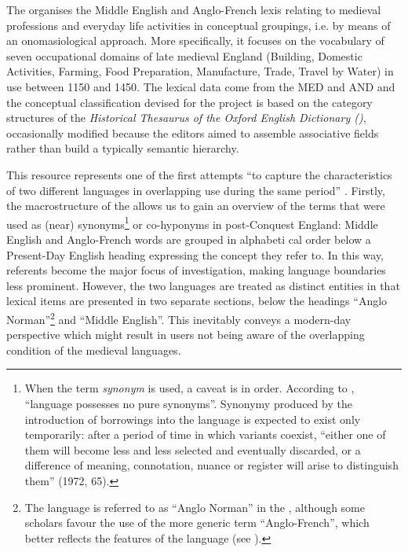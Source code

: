 \documentclass[output=paper,colorlinks,citecolor=brown,arabicfont,chinesefont]{langscibook}
\begin{document}
The \citet{[BTh]} organises the Middle English and Anglo-French lexis relating to medieval professions and everyday life activities in conceptual groupings, i.e. by means of an onomasiological approach. More specifically, it focuses on the vocabulary of seven occupational domains of late medieval England (Building, Domestic Activities, Farming, Food Preparation, Manufacture, Trade, Travel by Water) in use between 1150 and 1450. The lexical data come from the MED and AND and the conceptual classification devised for the project is based on the category structures of the \emph{Historical Thesaurus of the Oxford English Dictionary (\citealt{[HTOED]})}, occasionally modified because the editors aimed to assemble associative fields rather than build a typically semantic hierarchy.

This resource represents one of the first attempts “to capture the characteristics of two different languages in overlapping use during the same period” \citep[318]{Sylvester2017}. Firstly, the macrostructure of the \citet{[BTh]} allows us to gain an overview of the terms that were used as (near) synonyms\footnote{When the term \emph{synonym} is used, a caveat is in order. According to \citet{Samuels1972}, “language possesses no pure synonyms”. Synonymy produced by the introduction of borrowings into the language is expected to exist only temporarily: after a period of time in which variants coexist, “either one of them will become less and less selected and eventually discarded, or a difference of meaning, connotation, nuance or register will arise to distinguish them” (1972, 65).}  or co-hyponyms in post-Conquest England: Middle English and Anglo-French words are grouped in alphabeti     cal order below a Present-Day English heading expressing the concept they refer to. In this way, referents become the major focus of investigation, making language boundaries less prominent. However, the two languages are treated as distinct entities in that lexical items are presented in two separate sections, below the headings “Anglo Norman”\footnote{The language is referred to as “Anglo Norman” in the \citet{[BTh]}, although some scholars favour the use of the more generic term “Anglo-French”, which better reflects the features of the language (see \citealt[230]{Durkin2014}).} and “Middle English”. This inevitably conveys a modern-day perspective which might result in users not being aware of the overlapping condition of the medieval languages.
\end{document}
